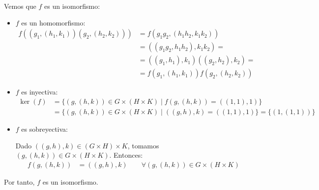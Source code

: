 \begin{ejercicio}
\begin{enumerate}
        Vemos que $f$ es un isomorfismo:
        \begin{itemize}
            \item $f$ es un homomorfismo:
                \begin{align*}
                    f((g_1,(h_1,k_1))(g_2,(h_2,k_2))) &= f(g_1g_2,(h_1h_2,k_1k_2))\\
                    &= ((g_1g_2,h_1h_2),k_1k_2) =\\&= ((g_1,h_1),k_1)((g_2,h_2),k_2) =\\&= f(g_1,(h_1,k_1))f(g_2,(h_2,k_2))
                \end{align*}
            \item $f$ es inyectiva:
                \begin{align*}
                    \ker (f) &= \{(g,(h,k))\in G\times (H\times K)\mid f(g,(h,k))=((1,1),1)\}\\
                    &= \{(g,(h,k))\in G\times (H\times K)\mid ((g,h),k)=((1,1),1)\} = \{(1,(1,1))\}
                \end{align*}
            \item $f$ es sobreyectiva:
                
            Dado $((g,h),k)\in (G\times H)\times K$, tomamos $(g,(h,k))\in G\times (H\times K)$. Entonces:
                \begin{align*}
                    f(g,(h,k)) &= ((g,h),k) \qquad \forall (g,(h,k))\in G\times (H\times K)
                \end{align*}
        \end{itemize}
        Por tanto, $f$ es un isomorfismo.
    \end{enumerate}
\end{ejercicio}

